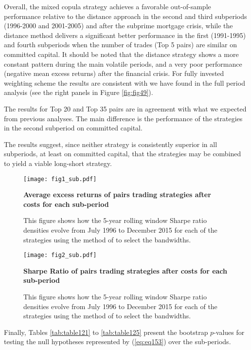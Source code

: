 \documentclass[a4paper]{article}
\begin{document}
Overall, the mixed copula strategy achieves a favorable out-of-sample performance relative to the distance approach in the second and third subperiods (1996-2000 and 2001-2005) and after the subprime mortgage crisis, while the distance method delivers a significant better performance in the first (1991-1995) and fourth subperiods when the number of trades (Top 5 pairs) are similar on committed capital. It should be noted that the distance strategy shows a more constant pattern during the main volatile periods, and a very poor performance (negative mean excess returns) after the financial crisis. For fully invested weighting scheme the results are consistent with we have found in the full period analysis (see the right panels in Figure \ref{fig:fig49}).

The results for Top 20 and Top 35 pairs are in agreement with what we expected from previous analyses. The main difference is the performance of the strategies in the second subperiod on committed capital.

The results suggest, since neither strategy is consistently superior in all subperiods, at least on committed capital, that the strategies may be combined to yield a viable long-short strategy.

\begin{figure}[H]
	\centering
	\texttt{[image: fig1\_sub.pdf]}
	\caption{\textbf{Average excess returns of pairs trading strategies after costs for each sub-period}}
	\caption*{\scriptsize This figure shows how the 5-year rolling window Sharpe ratio densities evolve from July 1996 to December 2015 for each of the strategies using the method of \citet*{sj1991} to select the bandwidths.}
	\label{fig:fig6}
\end{figure}

\begin{figure}[H]
	\centering
	\texttt{[image: fig2\_sub.pdf]}
	\caption{\textbf{Sharpe Ratio of pairs trading strategies after costs for each sub-period}}
	\caption*{\scriptsize This figure shows how the 5-year rolling window Sharpe ratio densities evolve from July 1996 to December 2015 for each of the strategies using the method of \citet*{sj1991} to select the bandwidths.}
	\label{fig:fig7}
\end{figure}


\medskip

Finally, Tables \ref{tab:table121} to \ref{tab:table125} present the bootstrap $p$-values for testing the null hypotheses represented by (\ref{eq:eq153}) over the sub-periods.
\end{document}
